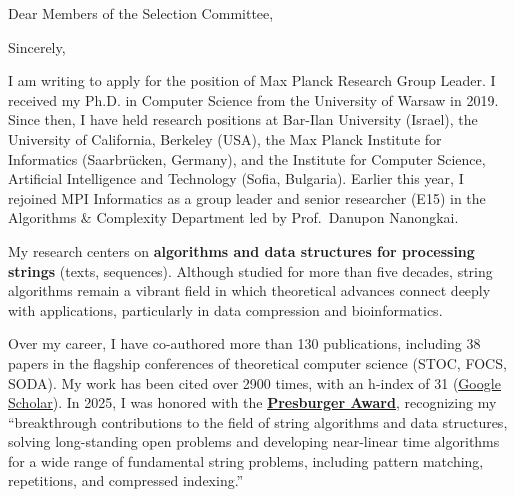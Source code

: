\documentclass[11pt,a4paper,sans]{moderncv}
\title{\vphantom{Title}}
\begin{document}
\date{October 14th, 2025}
\opening{Dear Members of the Selection Committee,}
\subject{Application for a Max Planck Research Group}
\closing{Sincerely,}
\makelettertitle

I am writing to apply for the position of Max Planck Research Group Leader. I received my Ph.D. in Computer Science from the University of Warsaw in 2019. Since then, I have held research positions at Bar-Ilan University (Israel), the University of California, Berkeley (USA), the Max Planck Institute for Informatics (Saarbrücken, Germany), and the Institute for Computer Science, Artificial Intelligence and Technology (Sofia, Bulgaria). Earlier this year, I rejoined MPI Informatics as a group leader and senior researcher (E15) in the Algorithms \& Complexity Department led by Prof.~Danupon Nanongkai.

My research centers on \textbf{algorithms and data structures for processing strings} (texts, sequences). Although studied for more than five decades, string algorithms remain a vibrant field in which theoretical advances connect deeply with applications, particularly in data compression and bioinformatics.

Over my career, I have co-authored more than 130 publications, including 38 papers in the flagship conferences of theoretical computer science (STOC, FOCS, SODA). My work has been cited over 2900 times, with an h-index of 31 (\underline{\href{https://scholar.google.com/citations?user=mudtARsAAAAJ}{Google Scholar}}). In 2025, I was honored with the \underline{\href{https://eatcs.org/index.php/presburger}{\textbf{Presburger Award}}}, recognizing my “breakthrough contributions to the field of string algorithms and data structures, solving long-standing open problems and developing near-linear time algorithms for a wide range of fundamental string problems, including pattern matching, repetitions, and compressed indexing.”
\end{document}
